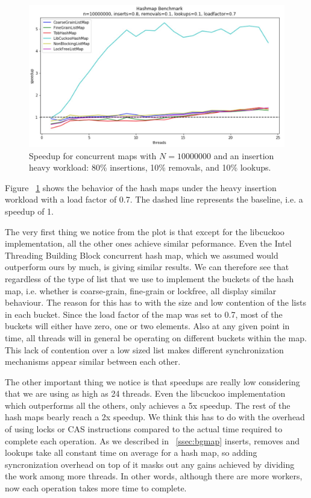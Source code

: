 \documentclass[11pt]{article}
\begin{document}
\begin{figure}[!htb]
\centering
\includegraphics[width=1.0\linewidth]{figs/patricio/latedays/inserts_heavy.jpg}
\caption{
Speedup for concurrent maps with $N=10000000$ and an insertion heavy workload:
80\% insertions, 10\% removals, and 10\% lookups.}
\label{fig:mapInsertHeavy}
\end{figure}

Figure ~\ref{fig:mapInsertHeavy} shows the behavior of the hash maps under the
heavy insertion workload with a load factor of 0.7. The dashed line represents
the baseline, i.e. a speedup of 1.  

The very first thing we notice from the plot is that except for the libcuckoo
implementation, all the other ones achieve similar peformance. Even the Intel 
Threading Building Block concurrent hash map, which we assumed would
outperform ours by much, is giving similar results. We can therefore see that regardless of the
type of list that we use to implement the buckets of the hash map, i.e. whether 
is coarse-grain, fine-grain or lockfree, all display similar behaviour.
The reason for this has to with the size and low contention of the lists in each bucket. 
Since the load factor of the map was set to 0.7, most of the buckets 
will either have zero, one or two elements. Also at any given point in time, all threads 
will in general be operating on different buckets within the map. This lack
of contention over a low sized list makes different synchronization mechanisms
appear similar between each other. 


The other important thing we notice is that speedups are really low considering
that we  are using as high as 24 threads. Even the libcuckoo implementation
which outperforms all the others, only achieves a 5x speedup. The rest of the
hash maps bearly reach a 2x speedup. We think this has to do with the
overhead of using locks or CAS instructions compared to the actual time required
to complete each operation. As we described in ~\ref{ssec:bgmap} inserts,
removes and lookups take all constant time on average for a hash map, so adding
syncronization overhead on top of it masks out any gains achieved by dividing
the work among more threads. In other words, although there are more workers,
now each operation takes more time to complete. 
\end{document}
